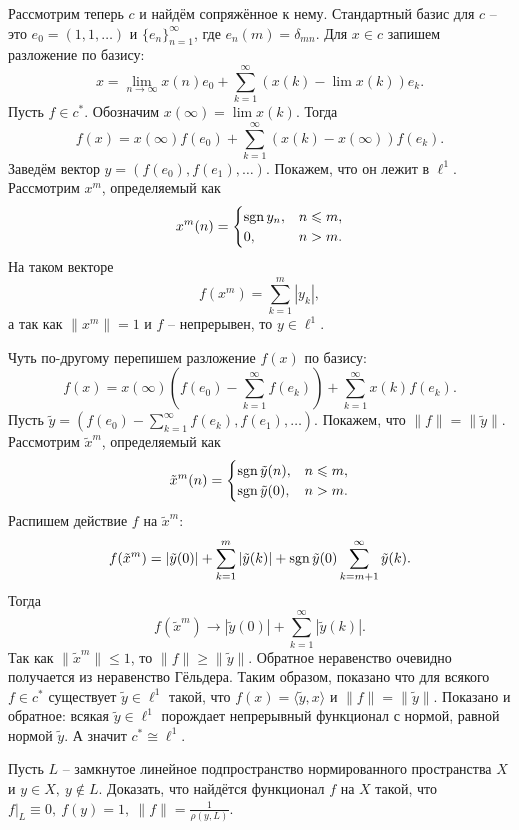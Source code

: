 \begin{solution}
    Рассмотрим теперь $c$ и найдём сопряжённое к нему.
    Стандартный базис для $c$ -- это $e_0 = (1, 1, \ldots)$ и $\{e_n\}_{n = 1}^{\infty}$, где $e_n(m) = \delta_{mn}$.
    Для $x \in c$ запишем разложение по базису:
    \[
        x = \lim_{n \rightarrow \infty} x(n) e_0 + \sum_{k = 1}^{\infty}(x(k) - \lim x(k))e_k.
    \]
    Пусть $f \in c^*$.
    Обозначим $x(\infty) = \lim x(k)$.
    Тогда
    \[
        f(x) = x(\infty)f(e_0) + \sum_{k = 1}^{\infty} (x(k) - x(\infty))f(e_k).
    \]
    Заведём вектор $y = (f(e_0), f(e_1), \ldots)$.
    Покажем, что он лежит в $\ell^1$.
    Рассмотрим $x^{m}$, определяемый как
    \[
        x^{m}(n) = \begin{cases}
                       \operatorname{sgn} y_n, & n \leqslant m, \\
                       0, & n > m.
        \end{cases}
    \]
    На таком векторе
    \[
        f(x^m) = \sum_{k = 1}^{m} |y_k|,
    \]
    а так как $\|x^m\| = 1$ и $f$ -- непрерывен, то $y \in \ell^1$.

    Чуть по-другому перепишем разложение $f(x)$ по базису:
    \[
        f(x) = x(\infty)\left(f(e_0) - \sum_{k = 1}^{\infty} f(e_k)\right) + \sum_{k = 1}^{\infty} x(k)f(e_k).
    \]
    Пусть $\tilde{y} = \left(f(e_0) - \sum_{k = 1}^{\infty} f(e_k), f(e_1), \ldots\right)$.
    Покажем, что $\|f\| = \|\tilde{y}\|$.
    Рассмотрим $\tilde{x}^{m}$, определяемый как
    \[
        \tilde{x}^{m}(n) =
        \begin{cases}
            \operatorname{sgn} \tilde{y}(n), & n \leqslant m, \\
            \operatorname{sgn} \tilde{y}(0), & n > m.
        \end{cases}
    \]
    Распишем действие $f$ на $\tilde{x}^{m}$:
    \[
        f(\tilde{x}^{m}) = |\tilde{y}(0)| + \sum_{k = 1}^{m} |\tilde{y}(k)| + \operatorname{sgn} \tilde{y}(0) \sum_{k = m + 1}^{\infty} \tilde{y}(k).
    \]
    Тогда
    \[
        f(\tilde{x}^{m}) \rightarrow |\tilde{y}(0)| + \sum_{k = 1}^{\infty} |\tilde{y}(k)|.
    \]
    Так как $\|\tilde{x}^{m}\| \leq 1$, то $\|f\| \geq \|\tilde{y}\|$.
    Обратное неравенство очевидно получается из неравенство Гёльдера.
    Таким образом, показано что для всякого $f \in c^*$ существует $\tilde{y} \in \ell^1$ такой, что $f(x) = \langle \tilde{y}, x \rangle$ и $\|f\| = \|\tilde{y}\|$.
    Показано и обратное: всякая $\tilde{y} \in \ell^1$ порождает непрерывный функционал с нормой, равной нормой $\tilde{y}$.
    А значит $c^* \cong \ell^1$.
\end{solution}
\begin{task}[9.3]
    Пусть $L$ -- замкнутое линейное подпространство нормированного пространства $X$ и $y \in X, \ y \notin L$.
    Доказать, что найдётся функционал $f$ на $X$ такой, что $f|_{L} \equiv 0, \ f(y) = 1, \ \|f\| = \frac{1}{\rho(y, L)}$.
\end{task}
